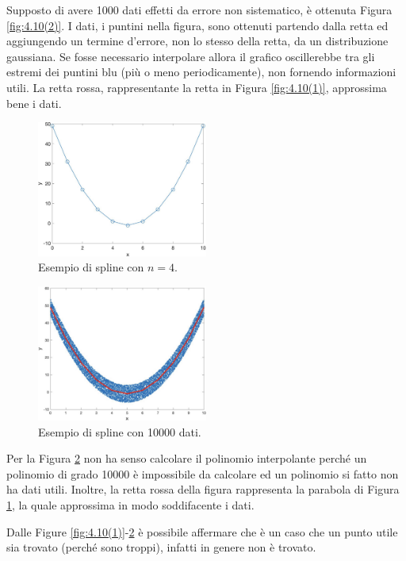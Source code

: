 Supposto di avere 1000 dati effetti da errore non sistematico, è ottenuta Figura \ref{fig:4.10(2)}. I dati, i puntini nella figura, sono ottenuti partendo dalla retta ed aggiungendo un termine d'errore, non lo stesso della retta, da un distribuzione gaussiana. Se fosse necessario interpolare allora il grafico oscillerebbe tra gli estremi dei puntini blu (più o meno periodicamente), non fornendo informazioni utili. La retta rossa, rappresentante la retta in Figura \ref{fig:4.10(1)}, approssima bene i dati.

\begin{figure}
    \centering
    \includegraphics[width=0.5\textwidth]{immagini/4.10(3).png}
    \caption{Esempio di spline con $n=4$.}\label{fig:4.10(3)}
\end{figure}

\begin{figure}
    \centering
    \includegraphics[width=0.5\textwidth]{immagini/4.10(4).png}
    \caption{Esempio di spline con 10000 dati.}\label{fig:4.10(4)}
\end{figure}

Per la Figura \ref{fig:4.10(4)} non ha senso calcolare il polinomio interpolante perché un polinomio di grado 10000 è impossibile da calcolare ed un polinomio si fatto non ha dati utili. Inoltre, la retta rossa della figura rappresenta la parabola di Figura \ref{fig:4.10(3)}, la quale approssima in modo soddifacente i dati.

Dalle Figure \ref{fig:4.10(1)}-\ref{fig:4.10(4)} è possibile affermare che è un caso che un punto utile sia trovato (perché sono troppi), infatti in genere non è trovato. 

